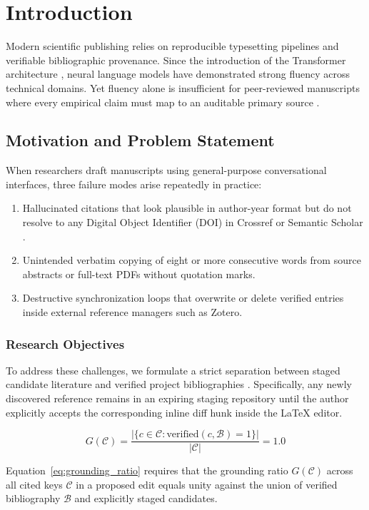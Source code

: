 \chapter{Introduction}
\label{chap:introduction}

Modern scientific publishing relies on reproducible typesetting pipelines and verifiable bibliographic provenance. Since the introduction of the Transformer architecture \cite{vaswani2017attention}, neural language models have demonstrated strong fluency across technical domains. Yet fluency alone is insufficient for peer-reviewed manuscripts where every empirical claim must map to an auditable primary source \cite{lewis2020retrieval}.

\section{Motivation and Problem Statement}
\label{sec:motivation}

When researchers draft manuscripts using general-purpose conversational interfaces, three failure modes arise repeatedly in practice:

\begin{enumerate}
  \item Hallucinated citations that look plausible in author-year format but do not resolve to any Digital Object Identifier (DOI) in Crossref or Semantic Scholar \cite{ammar2018construction}.
  \item Unintended verbatim copying of eight or more consecutive words from source abstracts or full-text PDFs without quotation marks.
  \item Destructive synchronization loops that overwrite or delete verified entries inside external reference managers such as Zotero.
\end{enumerate}

\subsection{Research Objectives}
\label{subsec:objectives}

To address these challenges, we formulate a strict separation between staged candidate literature and verified project bibliographies \cite{knuth1984texbook,lamport1994latex}. Specifically, any newly discovered reference remains in an expiring staging repository until the author explicitly accepts the corresponding inline diff hunk inside the LaTeX editor.

\begin{equation}
  \label{eq:grounding_ratio}
  G(\mathcal{C}) = \frac{|\{c \in \mathcal{C} : \text{verified}(c, \mathcal{B}) = 1\}|}{|\mathcal{C}|} = 1.0
\end{equation}

Equation~\eqref{eq:grounding_ratio} requires that the grounding ratio $G(\mathcal{C})$ across all cited keys $\mathcal{C}$ in a proposed edit equals unity against the union of verified bibliography $\mathcal{B}$ and explicitly staged candidates.
